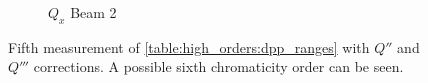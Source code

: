 \begin{figure}[!htb]
\begin{subfigure}{0.49\textwidth}
        \caption{$Q_x$ Beam 2}
        \label{}
    \end{subfigure}
    \caption{Fifth measurement of \cref{table:high_orders:dpp_ranges} with $Q''$ and $Q'''$
    corrections. A possible sixth chromaticity order can be seen.}
    \label{fig:high_orders:chroma_after_correction_full_range}
\end{figure}

